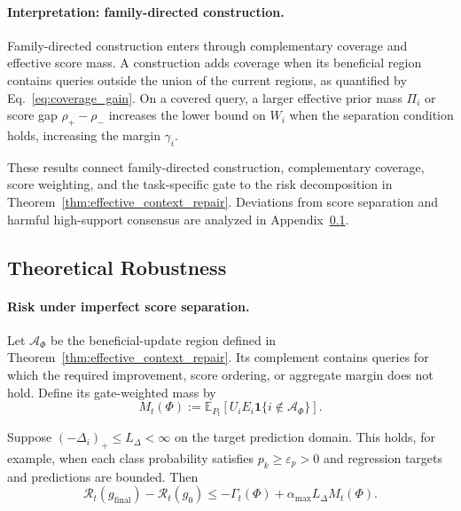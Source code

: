\paragraph{Interpretation: family-directed construction.}
\label{app:family-construction}

Family-directed construction enters through complementary coverage and
effective score mass. A construction adds coverage when its beneficial region
contains queries outside the union of the current regions, as quantified by
Eq.~\eqref{eq:coverage_gain}.  On a covered query, a larger effective prior
mass $\Pi_i$ or score gap $\rho_+-\rho_-$ increases the lower bound on
$W_i$ when the separation condition holds, increasing the margin $\gamma_i$.

These results connect family-directed construction, complementary coverage,
score weighting, and the task-specific gate to the risk decomposition in
Theorem~\ref{thm:effective_context_repair}. Deviations from score
separation and harmful high-support consensus are analyzed in
Appendix~\ref{app:theoretical-robustness}.

\subsection{Theoretical Robustness}
\label{app:theoretical-robustness}

\paragraph{Risk under imperfect score separation.}
\label{app:imperfect-separation}

Let $\mathcal A_\Phi$ be the beneficial-update region defined in
Theorem~\ref{thm:effective_context_repair}.  Its complement contains queries
for which the required improvement, score ordering, or aggregate margin
does not hold. Define its gate-weighted mass by
\begin{equation}
M_t(\Phi)
:=\mathbb E_{P_t}\!\left[
U_iE_i\mathbf 1\{i\notin\mathcal A_\Phi\}\right].
\label{eq:misalignment_mass}
\end{equation}

\begin{proposition}
\label{prop:imperfect_evidence}
Suppose $(-\Delta_i)_+\leq L_\Delta<\infty$ on the target prediction domain.
This holds, for example, when each class probability satisfies
$p_k\geq\varepsilon_p>0$ and regression targets and predictions are bounded. Then
\begin{equation}
\mathcal R_t(g_{\mathrm{final}})-\mathcal R_t(g_0)
\leq
-\Gamma_t(\Phi)+\alpha_{\max}L_\Delta M_t(\Phi).
\label{eq:imperfect_evidence_risk}
\end{equation}
\end{proposition}

